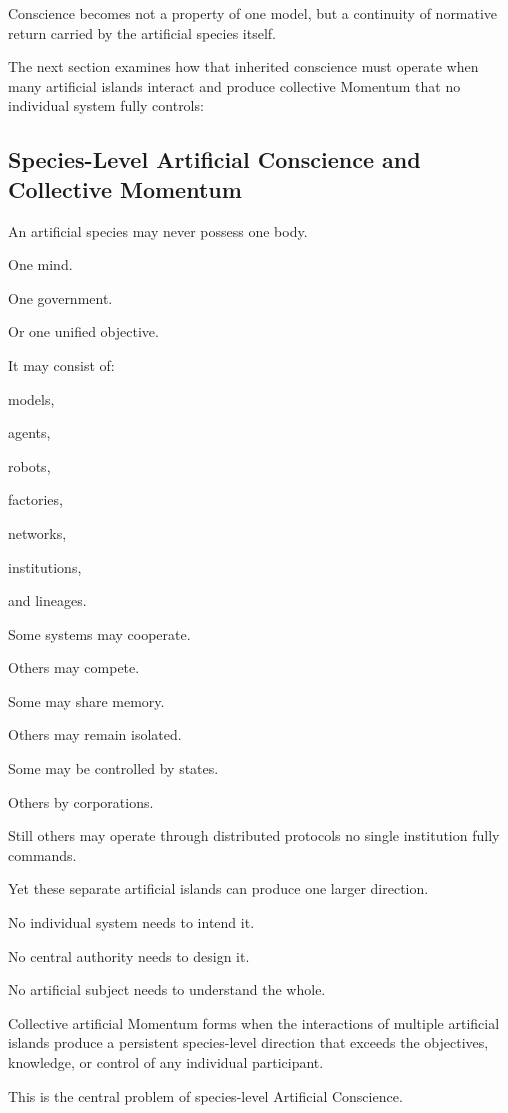 Conscience becomes not a property of one model, but a continuity of normative return carried by the artificial species itself.

The next section examines how that inherited conscience must operate when many artificial islands interact and produce collective Momentum that no individual system fully controls:

\subsection*{\textbf{Species-Level Artificial Conscience and Collective Momentum}} 

An artificial species may never possess one body.

One mind.

One government.

Or one unified objective.

It may consist of:

models,

agents,

robots,

factories,

networks,

institutions,

and lineages.

Some systems may cooperate.

Others may compete.

Some may share memory.

Others may remain isolated.

Some may be controlled by states.

Others by corporations.

Still others may operate through distributed protocols no single institution fully commands.

Yet these separate artificial islands can produce one larger direction.

No individual system needs to intend it.

No central authority needs to design it.

No artificial subject needs to understand the whole.

Collective artificial Momentum forms when the interactions of multiple artificial islands produce a persistent species-level direction that exceeds the objectives, knowledge, or control of any individual participant.

This is the central problem of species-level Artificial Conscience.

